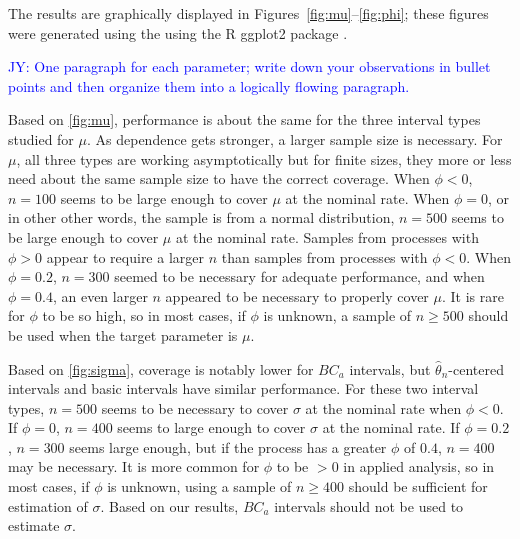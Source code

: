 \documentclass[12pt, letterpaper, titlepage]{article}
\newcommand{\jy}[1]{\textcolor{blue}{JY: #1}}
\begin{document}
The results are graphically displayed in Figures~\ref{fig:mu}--\ref{fig:phi};
these figures were generated using the using
the R ggplot2 package \citep{ggplot2}.



\jy{One paragraph for each parameter; write down your observations in bullet
  points and then organize them into a logically flowing paragraph.}

Based on \ref{fig:mu}, performance is
about the same for the three interval types studied for $\mu$. As dependence gets stronger,
a larger sample size is necessary. For $\mu$, all three types are working asymptotically 
but for finite sizes, they more or less need about the same sample size to have the 
correct coverage. When $\phi < 0$,
$n = 100$ seems to  be large enough to cover $\mu$ at the nominal rate. When
$\phi = 0$, or in other other words, the sample is from a normal distribution,
$n = 500$ seems to be large enough to cover $\mu$ at the nominal rate. Samples
from processes with $\phi > 0$ appear to require a larger $n$ than samples from
processes with $\phi < 0$. When $\phi = 0.2$, $n = 300$ seemed to be necessary
for adequate performance, and when $\phi = 0.4$, an even larger $n$ appeared
to be necessary to properly cover $\mu$. It is rare for $\phi$ to be so high,
so in most cases, if $\phi$ is unknown, a sample of $n \geq 500$ should be
used when the target parameter is $\mu$. 


Based on \ref{fig:sigma}, coverage is
notably lower for $BC_a$ intervals, but $\hat{\theta}_{n}$-centered intervals
and basic intervals have similar performance. For these two interval types,
$n = 500$ seems to be necessary to cover $\sigma$ at the nominal rate when
$\phi < 0$. If $\phi = 0$, $n = 400$ seems to large enough to cover $\sigma$ at
the nominal rate. If $\phi = 0.2$, $n = 300$ seems large enough, but if the
process has a greater $\phi$ of $0.4$, $n = 400$ may be necessary. It is more
common for $\phi$ to be $> 0$ in applied analysis, so in most cases, if $\phi$
is unknown, using a sample of $n \geq 400$ should be sufficient for estimation
of $\sigma$. Based on our results, $BC_a$ intervals should not be used to 
estimate $\sigma$.
\end{document}
